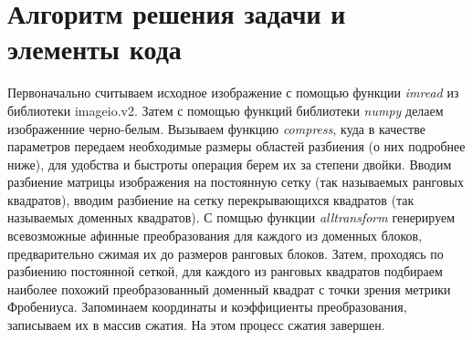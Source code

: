 \documentclass[12pt, fleqn]{article}
\begin{document}
  
\section{Алгоритм решения  задачи и элементы кода}Первоначально считываем исходное изображение с помощью функции \large{\it imread} из библиотеки imageio.v2. Затем с помощью функций библиотеки \large{\it numpy} делаем изображенние черно-белым. Вызываем функцию \large{\it compress}, куда в качестве параметров передаем необходимые размеры областей разбиения (о них подробнее ниже), для удобства и быстроты операция берем их за степени двойки. Вводим разбиение матрицы изображения на постоянную сетку (так называемых ранговых квадратов), вводим разбиение на сетку перекрывающихся квадратов (так называемых доменных квадратов). С помщью функции \large{\it alltransform}  генерируем всевозможные афинные преобразования для каждого из доменных блоков, предварительно сжимая их до размеров ранговых блоков. Затем, проходясь по разбиению постоянной сеткой, для каждого из ранговых квадратов подбираем наиболее похожий преобразованный доменный квадрат с точки зрения метрики Фробениуса. Запоминаем координаты и коэффициенты преобразования, записываем их в массив сжатия. На этом процесс сжатия завершен.
\end{document}
